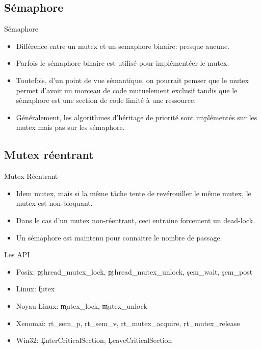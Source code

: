 \subsection{Sémaphore}

\begin{frame}{Sémaphore}
  \begin{itemize}
  \item  Différence entre un  mutex et  un semaphore  binaire: presque
    aucune.
  \item Parfois le sémaphore  binaire est utilisé pour implémentéer le
    mutex.
  \item Toutefois,  d'un point de  vue sémantique, on  pourrait pemser
    que  le  mutex  permet  d'avoir  un morceau  de  code  mutuelement
    exclusif tandis que le sémaphore  est une section de code limité à
    une ressource.
  \item  Généralement,  les algorithmes  d'héritage  de priorité  sont
    implémentés sur les mutex mais pas sur les sémaphore.
  \end{itemize}
\end{frame}

\subsection{Mutex réentrant}

\begin{frame}{Mutex Réentrant}
  \begin{itemize}
  \item Idem  mutex, mais  si la même  tâche tente de  revérouiller le
    même mutex, le mutex est non-bloquant.
  \item Dans le cas  d'un mutex non-réentrant, ceci entraine forcement
    un dead-lock.
  \item Un sémaphore est maintenu pour connaitre le nombre de passage.
  \end{itemize}
\end{frame}

\begin{frame}[fragile=singleslide]{Les API}
  \begin{itemize}
  \item   Posix:   \c{pthread_mutex_lock},   \c{pthread_mutex_unlock},
    \c{sem_wait}, \c{sem_post}
  \item Linux: \c{futex}
  \item Noyau Linux: \c{mutex_lock}, \c{mutex_unlock}
  \item  Xenomai:  \c{rt_sem_p},  \c{rt_sem_v},  \c{rt_mutex_acquire},
    \c{rt_mutex_release}
    \item Win32: \c{EnterCriticalSection}, \c{LeaveCriticalSection}
  \end{itemize}
\end{frame}


